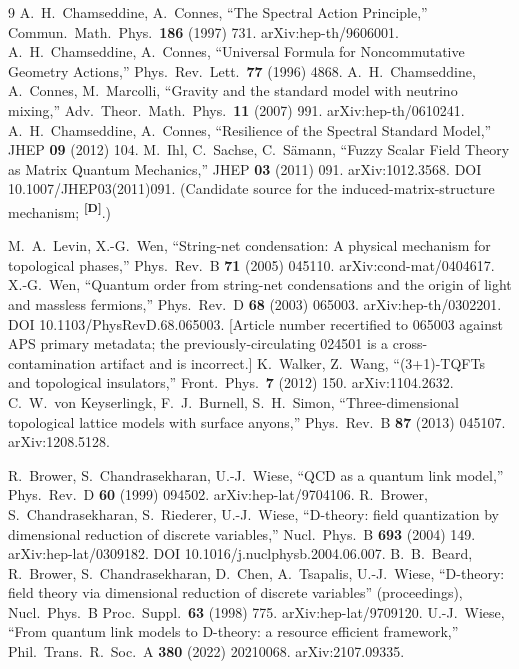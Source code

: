 \documentclass[12pt,a4paper,twoside]{article}
\theoremstyle{plain}
\theoremstyle{definition}
\theoremstyle{remark}
\newcommand{\catmark}[1]{\textsuperscript{\textsf{\textbf{[#1]}}}}
\begin{document}
\begin{thebibliography}{9}
A.~H.~Chamseddine, A.~Connes, ``The Spectral Action Principle,'' Commun.\ Math.\ Phys.\ \textbf{186} (1997) 731. arXiv:hep-th/9606001.
A.~H.~Chamseddine, A.~Connes, ``Universal Formula for Noncommutative Geometry Actions,'' Phys.\ Rev.\ Lett.\ \textbf{77} (1996) 4868.
A.~H.~Chamseddine, A.~Connes, M.~Marcolli, ``Gravity and the standard model with neutrino mixing,'' Adv.\ Theor.\ Math.\ Phys.\ \textbf{11} (2007) 991. arXiv:hep-th/0610241.
A.~H.~Chamseddine, A.~Connes, ``Resilience of the Spectral Standard Model,'' JHEP \textbf{09} (2012) 104.
M.~Ihl, C.~Sachse, C.~S\"amann, ``Fuzzy Scalar Field Theory as Matrix Quantum Mechanics,'' JHEP \textbf{03} (2011) 091. arXiv:1012.3568. DOI 10.1007/JHEP03(2011)091. (Candidate source for the induced-matrix-structure mechanism; \catmark{D}.)

M.~A.~Levin, X.-G.~Wen, ``String-net condensation: A physical mechanism for topological phases,'' Phys.\ Rev.\ B \textbf{71} (2005) 045110. arXiv:cond-mat/0404617.
X.-G.~Wen, ``Quantum order from string-net condensations and the origin of light and massless fermions,'' Phys.\ Rev.\ D \textbf{68} (2003) 065003. arXiv:hep-th/0302201. DOI 10.1103/PhysRevD.68.065003. [Article number recertified to 065003 against APS primary metadata; the previously-circulating 024501 is a cross-contamination artifact and is incorrect.]
K.~Walker, Z.~Wang, ``(3+1)-TQFTs and topological insulators,'' Front.\ Phys.\ \textbf{7} (2012) 150. arXiv:1104.2632.
C.~W.~von Keyserlingk, F.~J.~Burnell, S.~H.~Simon, ``Three-dimensional topological lattice models with surface anyons,'' Phys.\ Rev.\ B \textbf{87} (2013) 045107. arXiv:1208.5128.

R.~Brower, S.~Chandrasekharan, U.-J.~Wiese, ``QCD as a quantum link model,'' Phys.\ Rev.\ D \textbf{60} (1999) 094502. arXiv:hep-lat/9704106.
R.~Brower, S.~Chandrasekharan, S.~Riederer, U.-J.~Wiese, ``D-theory: field quantization by dimensional reduction of discrete variables,'' Nucl.\ Phys.\ B \textbf{693} (2004) 149. arXiv:hep-lat/0309182. DOI 10.1016/j.nuclphysb.2004.06.007.
B.~B.~Beard, R.~Brower, S.~Chandrasekharan, D.~Chen, A.~Tsapalis, U.-J.~Wiese, ``D-theory: field theory via dimensional reduction of discrete variables'' (proceedings), Nucl.\ Phys.\ B Proc.\ Suppl.\ \textbf{63} (1998) 775. arXiv:hep-lat/9709120.
U.-J.~Wiese, ``From quantum link models to D-theory: a resource efficient framework,'' Phil.\ Trans.\ R.\ Soc.\ A \textbf{380} (2022) 20210068. arXiv:2107.09335.


\end{thebibliography}
\end{document}
